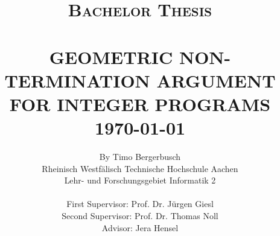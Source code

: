 
\title{ \normalsize \textsc{Bachelor Thesis}
	\\ [2.0cm]
	\HRule{0.5pt} \\
	\LARGE \textbf{\uppercase{Geometric Non-Termination Argument for Integer Programs}}
	\HRule{2pt} \\ [0.5cm]
	\normalsize \today \vspace*{5\baselineskip}}

\date{}

\author{
	By Timo Bergerbusch\\ 
	Rheinisch Westfälisch Technische Hochschule Aachen \\
	Lehr- und Forschungsgebiet Informatik 2  \\ \\
	First Supervisor: Prof. Dr. Jürgen Giesl \\
	Second Supervisor: Prof. Dr. Thomas Noll \\
	Advisor: Jera Hensel
	}

\maketitle